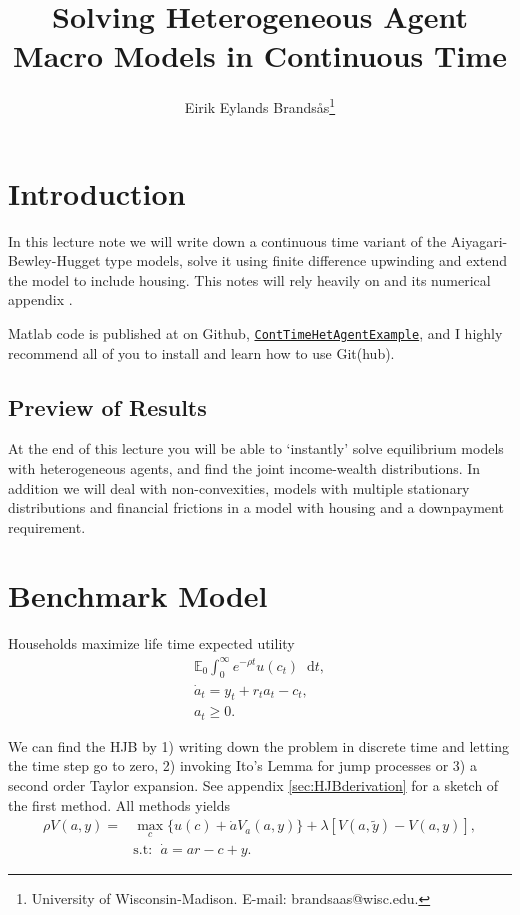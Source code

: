 \documentclass[12pt]{article}
\title{\vspace{-7ex}Solving Heterogeneous Agent Macro Models in Continuous Time}
\author{Eirik Eylands Brands\aa s\thanks{University  of  Wisconsin-Madison.  E-mail: brandsaas@wisc.edu. }}
\newcommand{\E}{\mathbb{E}}
\DeclareMathOperator{\1}{\mathbbm{1}}
\newcommand*\diff{\mathop{}\!\mathrm{d}}
\begin{document}
\maketitle

\section{Introduction}
In this lecture note we will write down a continuous time variant of the Aiyagari-Bewley-Hugget type models, solve it using finite difference upwinding and extend the model to include housing. This notes will rely heavily on \cite{Achdou2017} and its numerical appendix \cite{Achdou2017a}.

Matlab code is published at on Github, \href{https://github.com/eirikeb/ContTimeHetAgentExample/}{\texttt{ContTimeHetAgentExample}}, and I highly recommend all of you to install and learn how to use Git(hub).

\subsection{Preview of Results}
At the end of this lecture you will be able to `instantly' solve equilibrium models with heterogeneous agents, and find the joint income-wealth distributions. In addition we will deal with non-convexities, models with multiple stationary distributions and financial frictions in a model with housing and a downpayment requirement.




\section{Benchmark Model}
Households maximize life time expected utility
\begin{align}
\E_0 \int_0^\infty e^{-\rho t} u(c_t) \diff t, \\
\dot a_t = y_t + r_t a_t - c_t, \\
a_t\ge 0.
\end{align}

We can find the HJB by 1) writing down the problem in discrete time and letting the time step go to zero, 2) invoking Ito's Lemma for jump processes or 3) a second order Taylor expansion. See appendix \ref{sec:HJBderivation} for a sketch of the first method. All methods yields
\begin{align}\label{eq:HJB}
\rho V(a,y) =& \max_{c} \big\{ u(c) + \dot a V_a(a,y) \big\} + \lambda [V(a,\tilde y) - V(a,y)],\\
&\text{s.t: }\; \dot a = a r - c + y.
\end{align}
\end{document}
